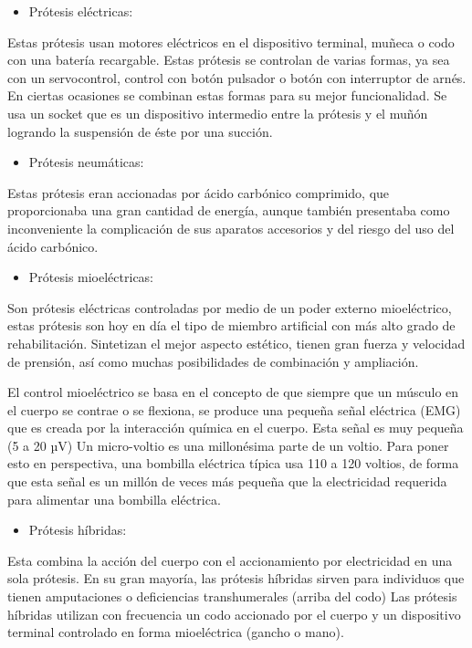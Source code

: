 \documentclass[a4paper]{article}
\begin{document}
\begin{itemize}
    \item Prótesis eléctricas:
\end{itemize}
Estas prótesis usan motores eléctricos en el dispositivo terminal, muñeca o codo con una batería recargable. Estas prótesis se controlan de varias formas, ya sea con un servocontrol, control con botón pulsador o botón con interruptor de arnés. En ciertas ocasiones se combinan estas formas para su mejor funcionalidad. Se usa un socket que es un dispositivo intermedio entre la prótesis y el muñón logrando la suspensión de éste por una succión. 

\begin{itemize}
    \item Prótesis neumáticas:
\end{itemize}
Estas prótesis eran accionadas por ácido carbónico comprimido, que proporcionaba una gran cantidad de energía, aunque también presentaba como inconveniente la complicación de sus aparatos accesorios y del riesgo del uso del ácido carbónico. 

\begin{itemize}
    \item Prótesis mioeléctricas:
\end{itemize}
Son prótesis eléctricas controladas por medio de un poder externo mioeléctrico, estas prótesis son hoy en día el tipo de miembro artificial con más alto grado de rehabilitación. Sintetizan el mejor aspecto estético, tienen gran fuerza y velocidad de prensión, así como muchas posibilidades de combinación y ampliación. 

El control mioeléctrico se basa en el concepto de que siempre que un músculo en el cuerpo se contrae o se flexiona, se produce una pequeña señal eléctrica (EMG) que es creada por la interacción química en el cuerpo. Esta señal es muy pequeña (5 a 20 µV) Un micro-voltio es una millonésima parte de un voltio. Para poner esto en perspectiva, una bombilla eléctrica típica usa 110 a 120 voltios, de forma que esta señal es un millón de veces más pequeña que la electricidad requerida para alimentar una bombilla eléctrica. 

\begin{itemize}
    \item Prótesis híbridas:
\end{itemize}
Esta combina la acción del cuerpo con el accionamiento por electricidad en una sola prótesis. En su gran mayoría, las prótesis híbridas sirven para individuos que tienen amputaciones o deficiencias transhumerales (arriba del codo) Las prótesis híbridas utilizan con frecuencia un codo accionado por el cuerpo y un dispositivo terminal controlado en forma mioeléctrica (gancho o mano)\cite{ff4}. 
\end{document}

